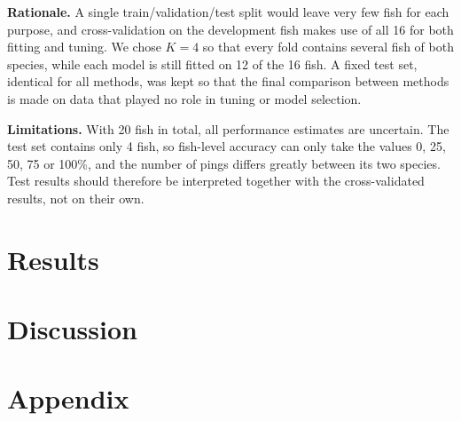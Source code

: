 \documentclass[
  letterpaper,
  DIV=11,
  numbers=noendperiod]{scrartcl}
\begin{document}
\textbf{Rationale.} A single train/validation/test split would leave
very few fish for each purpose, and cross-validation on the development
fish makes use of all 16 for both fitting and tuning. We chose \(K=4\)
so that every fold contains several fish of both species, while each
model is still fitted on 12 of the 16 fish. A fixed test set, identical
for all methods, was kept so that the final comparison between methods
is made on data that played no role in tuning or model selection.

\textbf{Limitations.} With 20 fish in total, all performance estimates
are uncertain. The test set contains only 4 fish, so fish-level accuracy
can only take the values 0, 25, 50, 75 or 100\%, and the number of pings
differs greatly between its two species. Test results should therefore
be interpreted together with the cross-validated results, not on their
own.

\hypertarget{results}{%
\section{Results}\label{results}}

\hypertarget{discussion}{%
\section{Discussion}\label{discussion}}

\hypertarget{sec-appendix-a}{%
\section{Appendix}\label{sec-appendix-a}}

\setcounter{figure}{0}
\renewcommand{\thefigure}{A\arabic{figure}}

\setcounter{table}{0}
\renewcommand{\thetable}{A\arabic{table}}
\end{document}
